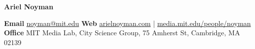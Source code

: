 \documentclass[10pt]{book}
\newcommand{\myname}{Ariel Noyman}
\begin{document}
\pagestyle{empty}
\begin{center}
    \vfill
\end{center}
\vspace{2em}


\begin{flushleft}
    {\Huge\bfseries {\myname}}
\end{flushleft}


\textbf{Email} \href{mailto:noyman@mit.edu}{noyman@mit.edu}
\newline
\textbf{Web} \href{http://www.arielnoyman.com/}{arielnoyman.com} | \href{https://www.media.mit.edu/people/noyman/overview/}{media.mit.edu/people/noyman}
\newline
\textbf{Office} MIT Media Lab, City Science Group, 75 Amherst St, Cambridge, MA 02139













\end{document}
